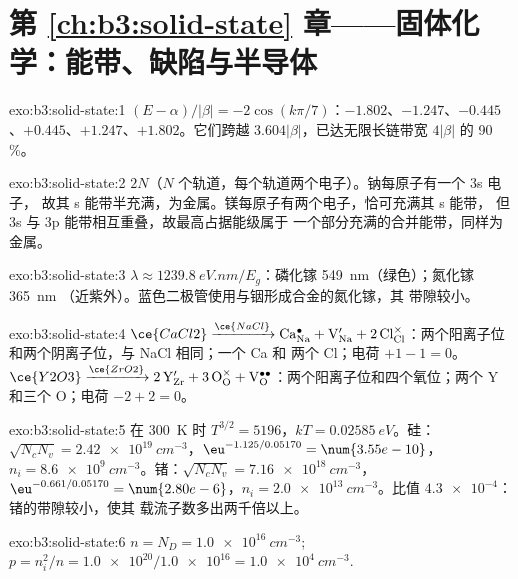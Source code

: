 \section*{第 \ref{ch:b3:solid-state} 章——固体化学：能带、缺陷与半导体}

\begin{solution}{exo:b3:solid-state:1}
$(E - \alpha)/|\beta| = -2\cos(k\pi/7)$：$-1.802$、$-1.247$、$-0.445$、$+0.445$、$+1.247$、$+1.802$。它们跨越
$3.604|\beta|$，已达无限长链带宽 $4|\beta|$ 的 90\,\%。
\end{solution}

\begin{solution}{exo:b3:solid-state:2}
$2N$（$N$ 个轨道，每个轨道两个电子）。钠每原子有一个 3s 电子，
故其 s 能带半充满，为金属。镁每原子有两个电子，恰可充满其 s 能带，
但 3s 与 3p 能带相互重叠，故最高占据能级属于
一个部分充满的合并能带，同样为金属。
\end{solution}

\begin{solution}{exo:b3:solid-state:3}
$\lambda \approx \qty{1239.8}{eV.nm}/E_g$：磷化镓 \qty{549}{nm}（绿色）；氮化镓 \qty{365}{nm}
（近紫外）。蓝色二极管使用与铟形成合金的氮化镓，其
带隙较小。
\end{solution}

\begin{solution}{exo:b3:solid-state:4}
$\ce{CaCl2} \xrightarrow{\ce{NaCl}} \mathrm{Ca_{Na}^{\bullet} + V_{Na}' + 2\,Cl_{Cl}^{\times}}$：两个阳离子位和两个阴离子位，与 NaCl 相同；一个 Ca 和
两个 Cl；电荷 $+1 - 1 = 0$。$\ce{Y2O3} \xrightarrow{\ce{ZrO2}} \mathrm{2\,Y_{Zr}' + 3\,O_O^{\times} + V_O^{\bullet\bullet}}$：两个阳离子位和四个氧位；两个 Y
和三个 O；电荷 $-2 + 2 = 0$。
\end{solution}

\begin{solution}{exo:b3:solid-state:5}
在 \qty{300}{K} 时 $T^{3/2} = 5196$，$kT = \qty{0.02585}{eV}$。硅：$\sqrt{N_cN_v} = \qty{2.42e19}{cm^{-3}}$，$\eu^{-1.125/0.05170} = \num{3.55e-10}$，
$n_i = \qty{8.6e9}{cm^{-3}}$。锗：$\sqrt{N_cN_v} = \qty{7.16e18}{cm^{-3}}$，$\eu^{-0.661/0.05170} = \num{2.80e-6}$，$n_i = \qty{2.0e13}{cm^{-3}}$。比值
$\num{4.3e-4}$：锗的带隙较小，使其
载流子数多出两千倍以上。
\end{solution}

\begin{solution}{exo:b3:solid-state:6}
$n = N_D = \qty{1.0e16}{cm^{-3}}$; $p = n_i^2/n = \num{1.0e20}/\num{1.0e16} = \qty{1.0e4}{cm^{-3}}$.
\end{solution}


